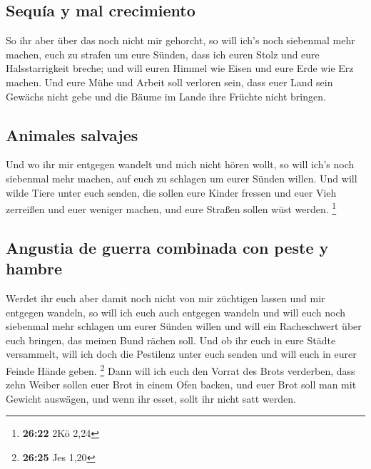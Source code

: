\hypertarget{sequuxeda-y-mal-crecimiento}{%
\subsection{Sequía y mal
crecimiento}\label{sequuxeda-y-mal-crecimiento}}

 So ihr aber über das noch nicht mir gehorcht, so will
ich's noch siebenmal mehr machen, euch zu strafen um eure Sünden,
 dass ich euren Stolz und eure Halsstarrigkeit breche;
und will euren Himmel wie Eisen und eure Erde wie Erz machen.
 Und eure Mühe und Arbeit soll verloren sein, dass euer
Land sein Gewächs nicht gebe und die Bäume im Lande ihre Früchte nicht
bringen.

\hypertarget{animales-salvajes}{%
\subsection{Animales salvajes}\label{animales-salvajes}}

 Und wo ihr mir entgegen wandelt und mich nicht hören
wollt, so will ich's noch siebenmal mehr machen, auf euch zu schlagen um
eurer Sünden willen.  Und will wilde Tiere unter euch
senden, die sollen eure Kinder fressen und euer Vieh zerreißen und euer
weniger machen, und eure Straßen sollen wüst werden. \footnote{\textbf{26:22}
  2Kö 2,24}

\hypertarget{angustia-de-guerra-combinada-con-peste-y-hambre}{%
\subsection{Angustia de guerra combinada con peste y
hambre}\label{angustia-de-guerra-combinada-con-peste-y-hambre}}

 Werdet ihr euch aber damit noch nicht von mir züchtigen
lassen und mir entgegen wandeln,  so will ich euch auch
entgegen wandeln und will euch noch siebenmal mehr schlagen um eurer
Sünden willen  und will ein Racheschwert über euch
bringen, das meinen Bund rächen soll. Und ob ihr euch in eure Städte
versammelt, will ich doch die Pestilenz unter euch senden und will euch
in eurer Feinde Hände geben. \footnote{\textbf{26:25} Jes 1,20}
 Dann will ich euch den Vorrat des Brots verderben, dass
zehn Weiber sollen euer Brot in einem Ofen backen, und euer Brot soll
man mit Gewicht auswägen, und wenn ihr esset, sollt ihr nicht satt
werden.

